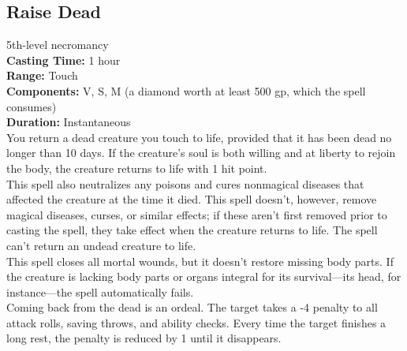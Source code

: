 \documentclass[11pt, A4paper, english]{article}
\begin{document}
		\subsection{Raise Dead}
5th-level necromancy \\
\textbf{Casting Time:} 1 hour \\
\textbf{Range:} Touch \\
\textbf{Components:} V, S, M (a diamond worth at least 500 gp, which the spell consumes) \\
\textbf{Duration:} Instantaneous \\
You return a dead creature you touch to life, provided that it has been dead no longer than 10 days. If the creature’s soul is both willing and at liberty to rejoin the body, the creature returns to life with 1 hit point. \\
This spell also neutralizes any poisons and cures nonmagical diseases that affected the creature at the time it died. This spell doesn’t, however, remove magical diseases, curses, or similar effects; if these aren’t first removed prior to casting the spell, they take effect when the creature returns to life. The spell can’t return an undead creature to life. \\
This spell closes all mortal wounds, but it doesn’t restore missing body parts. If the creature is lacking body parts or organs integral for its survival—its head, for instance—the spell automatically fails. \\
Coming back from the dead is an ordeal. The target takes a -4 penalty to all attack rolls, saving throws, and ability checks. Every time the target finishes a long rest, the penalty is reduced by 1 until it disappears.
\end{document}
